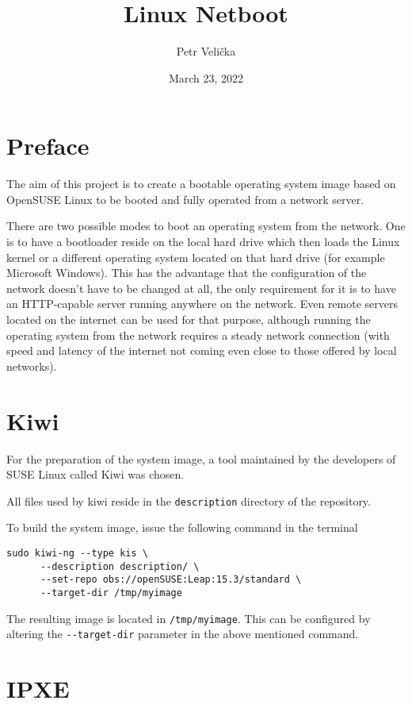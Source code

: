 \documentclass{article}
\title{Linux Netboot}
\date{March 23, 2022}
\author{Petr Velička}
\begin{document}
\maketitle

\section{Preface}

The aim of this project is to create a bootable operating system image based on OpenSUSE Linux to be booted and fully operated from a network server.

There are two possible modes to boot an operating system from the network. One is to have a bootloader reside on the local hard drive which then loads the Linux kernel or a different operating system located on that hard drive (for example Microsoft Windows). This has the advantage that the configuration of the network doesn't have to be changed at all, the only requirement for it is to have an HTTP-capable server running anywhere on the network. Even remote servers located on the internet can be used for that purpose, although running the operating system from the network requires a steady network connection (with speed and latency of the internet not coming even close to those offered by local networks).

\section{Kiwi}

For the preparation of the system image, a tool maintained by the developers of SUSE Linux called Kiwi was chosen.

All files used by kiwi reside in the \verb|description| directory of the repository. 

To build the system image, issue the following command in the terminal

\begin{verbatim}
sudo kiwi-ng --type kis \
      --description description/ \
      --set-repo obs://openSUSE:Leap:15.3/standard \
      --target-dir /tmp/myimage
\end{verbatim}

The resulting image is located in \verb|/tmp/myimage|. This can be configured by altering the \verb|--target-dir| parameter in the above mentioned command.

\section{IPXE}
\end{document}
